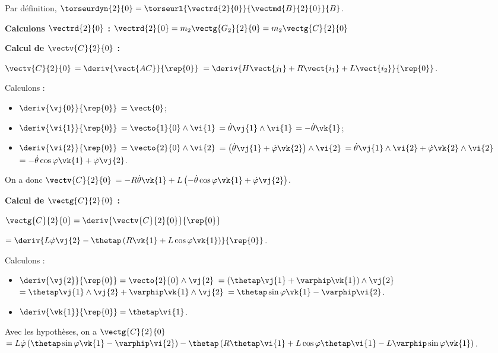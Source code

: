 \begin{corrigebox}
Par définition, $\torseurdyn{2}{0} = \torseurl{\vectrd{2}{0}}{\vectmd{B}{2}{0}}{B}$.

\textbf{Calculons $\vectrd{2}{0}$ : } 
$\vectrd{2}{0} = m_2\vectg{G_2}{2}{0}=m_2 \vectg{C}{2}{0} $

\textbf{Calcul de $\vectv{C}{2}{0}$ : }  

$\vectv{C}{2}{0}$ 
$=\deriv{\vect{AC}}{\rep{0}}$
$=\deriv{H\vect{j_1}+R\vect{i_1}+L\vect{i_2}}{\rep{0}}$.

Calculons : 
\begin{itemize}
\item $\deriv{\vj{0}}{\rep{0}}$ $=\vect{0}$;
\item $\deriv{\vi{1}}{\rep{0}}$ $=\vecto{1}{0} \wedge \vi{1}$ $=\dot{\theta}\vj{1} \wedge \vi{1}$ $=-\dot{\theta}\vk{1}$;
\item $\deriv{\vi{2}}{\rep{0}}$ $=\vecto{2}{0} \wedge \vi{2}$ 
$=\left(\dot{\theta}\vj{1} + \dot{\varphi}\vk{2}\right)\wedge \vi{2}$
$=\dot{\theta}\vj{1}\wedge \vi{2} + \dot{\varphi}\vk{2}\wedge \vi{2}$
$=-\dot{\theta}\cos\varphi\vk{1} + \dot{\varphi}\vj{2}$.
\end{itemize}

On a donc 
$\vectv{C}{2}{0}$ 
$= -R\dot{\theta}\vk{1}+L\left(-\dot{\theta}\cos\varphi\vk{1} + \dot{\varphi}\vj{2}\right)$.

\textbf{Calcul de $\vectg{C}{2}{0}$ : }  

$\vectg{C}{2}{0} =\deriv{\vectv{C}{2}{0}}{\rep{0}}$

$ =\deriv{ L\dot{\varphi}\vj{2}-\thetap\left( R\vk{1}+L\cos\varphi\vk{1}\right)}{\rep{0}} $.

Calculons :
\begin{itemize}
\item $\deriv{\vj{2}}{\rep{0}}=\vecto{2}{0}\wedge\vj{2}$ 
$=\left(\thetap\vj{1}+\varphip\vk{1} \right)\wedge\vj{2}$ 
$=\thetap\vj{1}\wedge\vj{2}+\varphip\vk{1} \wedge\vj{2}$
$=\thetap\sin\varphi\vk{1}-\varphip\vi{2} $.
\item $\deriv{\vk{1}}{\rep{0}} = \thetap\vi{1}$.
\end{itemize}

Avec les hypothèses, on a $\vectg{C}{2}{0} $
$ =L\dot{\varphi}\left(\thetap\sin\varphi\vk{1}-\varphip\vi{2}\right)
-\thetap\left( R \thetap\vi{1} +L\cos\varphi \thetap\vi{1}
-L\varphip\sin\varphi\vk{1}\right)
$.


\end{corrigebox}
